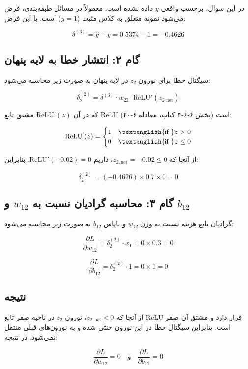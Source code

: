 \documentclass[11pt,a4paper]{article}
\newcommand{\en}[1]{\textenglish{#1}}
\begin{document}
در این سوال، برچسب واقعی \(y\) داده نشده است. معمولاً در مسائل طبقه‌بندی، فرض می‌شود نمونه متعلق به کلاس مثبت (\(y=1\)) است. با این فرض:

\[
\delta^{(3)} = \hat{y} - y = 0.5374 - 1 = -0.4626
\]

\subsection{گام ۲: انتشار خطا به لایه پنهان}

سیگنال خطا برای نورون \(z_2\) در لایه پنهان به صورت زیر محاسبه می‌شود:

\[
\delta^{(2)}_2 = \delta^{(3)} \cdot w_{22} \cdot \text{ReLU}'(z_{2,\text{net}})
\]

که در آن \(\text{ReLU}'(z)\) مشتق تابع \en{ReLU} است (بخش \en{۶-۶-۴} کتاب، معادله \en{۶-۴۰}):

\[
\text{ReLU}'(z) = 
\begin{cases} 
1 & \text{\en{if }} z > 0 \\
0 & \text{\en{if }} z \le 0
\end{cases}
\]

از آنجا که \(z_{2,\text{net}} = -0.02 \le 0\)، داریم \(\text{ReLU}'(-0.02) = 0\). بنابراین:

\[
\delta^{(2)}_2 = (-0.4626) \times 0.7 \times 0 = 0
\]

\subsection{گام ۳: محاسبه گرادیان نسبت به \(w_{12}\) و \(b_{12}\)}

گرادیان تابع هزینه نسبت به وزن \(w_{12}\) و بایاس \(b_{12}\) به صورت زیر محاسبه می‌شود:

\[
\frac{\partial L}{\partial w_{12}} = \delta^{(2)}_2 \cdot x_1 = 0 \times 0.3 = 0
\]

\[
\frac{\partial L}{\partial b_{12}} = \delta^{(2)}_2 \cdot 1 = 0 \times 1 = 0
\]

\subsection{نتیجه}

از آنجا که \(z_{2,\text{net}} < 0\)، نورون \(z_2\) در ناحیه صفر تابع \en{ReLU} قرار دارد و مشتق آن صفر است. بنابراین سیگنال خطا در این نورون خنثی شده و به نورون‌های قبلی منتقل نمی‌شود. در نتیجه:

\[
\boxed{\frac{\partial L}{\partial w_{12}} = 0 \quad \text{و} \quad \frac{\partial L}{\partial b_{12}} = 0}
\]
\end{document}
